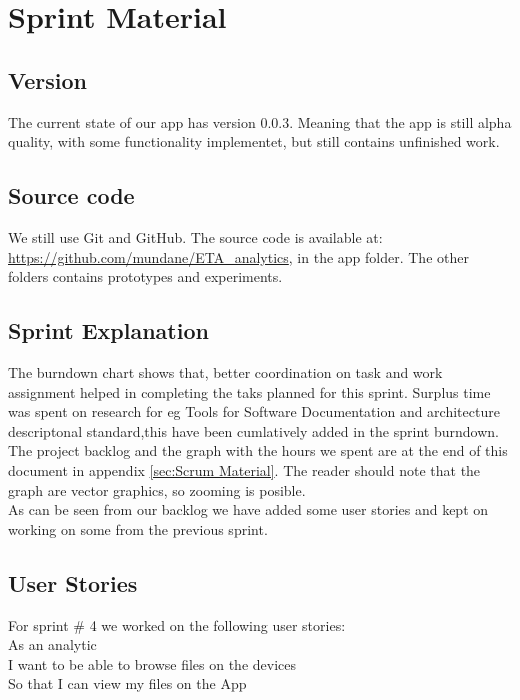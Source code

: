 \section{Sprint Material} %
\label{sec:Sprint Material}
\subsection{Version} %
\label{sub:Version}
The current state of our app has version 0.0.3. Meaning that the app is still alpha quality, with some functionality implementet, but still contains unfinished work.
\subsection{Source code} %
\label{sub:Source code}
We still use Git and GitHub. The source code is available at: \url{https://github.com/mundane/ETA_analytics}, in the app folder. The other folders contains prototypes and experiments.
\subsection{Sprint Explanation}
The burndown chart shows that, better coordination on task and work assignment helped in completing the taks planned for this sprint.
Surplus time was spent on research for eg Tools for Software Documentation and architecture descriptonal standard,this have been cumlatively added in the sprint burndown.
The project backlog and the graph with the hours we spent are at the end of this document in appendix \ref{sec:Scrum Material}. The reader should note that the graph are vector graphics, so zooming is posible. \\
As can be seen from our backlog we have added some user stories and kept on working on some from the previous sprint.
\subsection{User Stories}
For sprint \# 4 we worked on the following user stories: \\

As an analytic \\
I want to be able to browse files on the devices\\
So that I can view my files on the App \\

